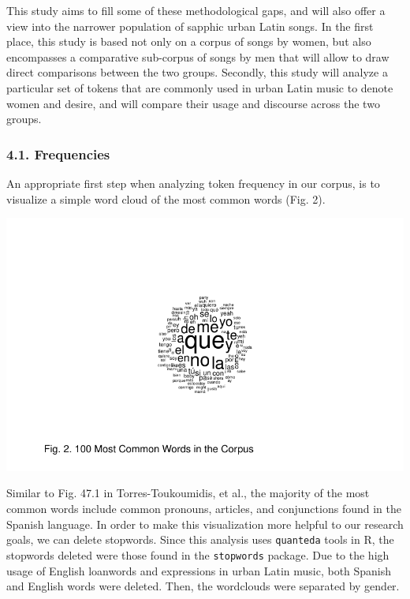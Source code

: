 \documentclass[
  letterpaper,
  DIV=11,
  numbers=noendperiod]{scrartcl}
\begin{document}
This study aims to fill some of these methodological gaps, and will also
offer a view into the narrower population of sapphic urban Latin songs.
In the first place, this study is based not only on a corpus of songs by
women, but also encompasses a comparative sub-corpus of songs by men
that will allow to draw direct comparisons between the two groups.
Secondly, this study will analyze a particular set of tokens that are
commonly used in urban Latin music to denote women and desire, and will
compare their usage and discourse across the two groups.

\hypertarget{frequencies}{%
\subsubsection{\texorpdfstring{4.1.
\textbf{Frequencies}}{4.1. Frequencies}}\label{frequencies}}

An appropriate first step when analyzing token frequency in our corpus,
is to visualize a simple word cloud of the most common words (Fig. 2).

\includegraphics{Sastoque_Essay3_files/figure-pdf/word-cloud-1.pdf}

Similar to Fig. 47.1 in Torres-Toukoumidis, et al., the majority of the
most common words include common pronouns, articles, and conjunctions
found in the Spanish language. In order to make this visualization more
helpful to our research goals, we can delete stopwords. Since this
analysis uses \texttt{quanteda} tools in R, the stopwords deleted were
those found in the \texttt{stopwords} package. Due to the high usage of
English loanwords and expressions in urban Latin music, both Spanish and
English words were deleted. Then, the wordclouds were separated by
gender.
\end{document}
